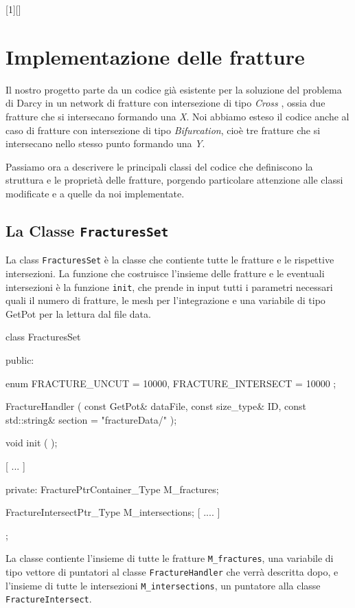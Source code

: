 [1][]{}{}

\chapter{Implementazione delle fratture}

Il nostro progetto parte da un codice già esistente per la soluzione del problema di Darcy in un network di fratture con intersezione di tipo \textit{Cross }, ossia due fratture che si intersecano formando una \textit{X}. Noi abbiamo esteso il codice anche al caso di fratture con intersezione di tipo \textit{Bifurcation}, cioè tre fratture che si intersecano nello stesso punto formando una \textit{Y}.

Passiamo ora a descrivere le principali classi del codice che definiscono la struttura e le proprietà delle fratture, porgendo particolare attenzione alle classi modificate e a quelle da noi implementate.

\section{La Classe \texttt{FracturesSet}}
La class \texttt{FracturesSet} è la classe che contiente tutte le fratture e le rispettive intersezioni. La funzione che costruisce l'insieme delle fratture e le eventuali intersezioni è la funzione  \texttt{init}, che prende in input tutti i parametri necessari quali il numero di fratture, le mesh per l'integrazione e una variabile di tipo GetPot per la lettura dal file data. 

\begin{Code}[caption={Classe \texttt{FracturesSet}}]
class FracturesSet
{
public:

    enum
    {
        FRACTURE_UNCUT = 10000,
        FRACTURE_INTERSECT = 10000
    };

    FractureHandler ( const GetPot& dataFile,
                      const size_type& ID,
                      const std::string& section = "fractureData/" );

    void init ( );

    [ ... ]

private:
	FracturePtrContainer_Type M_fractures;

	FractureIntersectPtr_Type M_intersections;
	[ .... ]
};
\end{Code}
La classe contiente l'insieme di tutte le fratture \texttt{M\_fractures}, una variabile di tipo vettore di puntatori al classe \texttt{FractureHandler} che verrà descritta dopo, e l'insieme di tutte le intersezioni \texttt{M\_intersections}, un puntatore alla classe \texttt{FractureIntersect}. 


